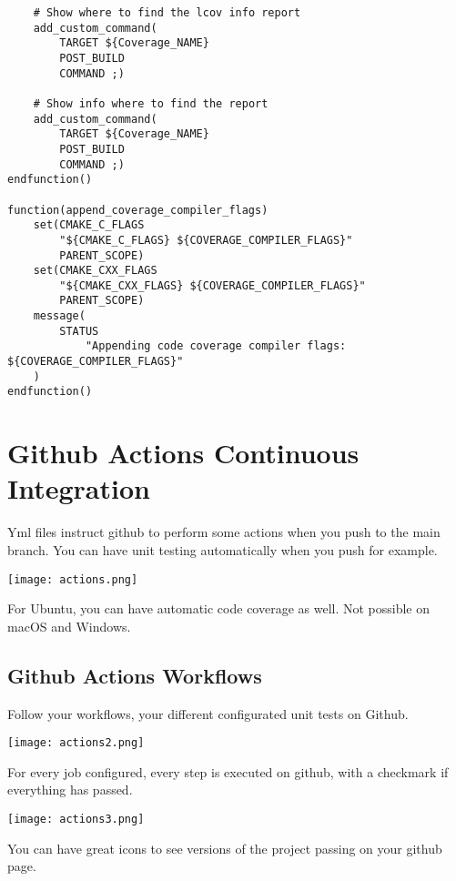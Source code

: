 \documentclass[openany]{report}
\begin{document}
\begin{verbatim}
    # Show where to find the lcov info report
    add_custom_command(
        TARGET ${Coverage_NAME}
        POST_BUILD
        COMMAND ;)

    # Show info where to find the report
    add_custom_command(
        TARGET ${Coverage_NAME}
        POST_BUILD
        COMMAND ;)
endfunction()

function(append_coverage_compiler_flags)
    set(CMAKE_C_FLAGS
        "${CMAKE_C_FLAGS} ${COVERAGE_COMPILER_FLAGS}"
        PARENT_SCOPE)
    set(CMAKE_CXX_FLAGS
        "${CMAKE_CXX_FLAGS} ${COVERAGE_COMPILER_FLAGS}"
        PARENT_SCOPE)
    message(
        STATUS
            "Appending code coverage compiler flags: ${COVERAGE_COMPILER_FLAGS}"
    )
endfunction()
\end{verbatim}


\section{Github Actions Continuous Integration}

Yml files instruct github to perform some actions when you push to the main branch. 
You can have unit testing automatically when you push for example.


\begin{center}
    \texttt{[image: actions.png]}
\end{center}

For Ubuntu, you can have automatic code coverage as well. Not possible on macOS and Windows.


\subsection{Github Actions Workflows}

Follow your workflows, your different configurated unit tests on Github.


\begin{center}
    \texttt{[image: actions2.png]}
\end{center}

For every job configured, every step is executed on github, with a checkmark if everything has passed.


\begin{center}
    \texttt{[image: actions3.png]}
\end{center}

You can have great icons to see versions of the project passing on your github page.
\end{document}

